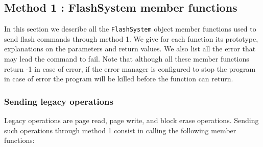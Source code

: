 \subsection{Method 1 : FlashSystem member functions}

In this section we describe all the \verb+FlashSystem+ object member functions used to send flash commands through method 1. We give for each function its prototype, explanations on the parameters and return values. We also list all the error that may lead the command to fail. Note that although all these member functions return -1 in case of error, if the error manager is configured to stop the program in case of error the program will be killed before the function can return.

\subsubsection{Sending legacy operations}

Legacy operations are page read, page write, and block erase operations. Sending such operations through method 1 consist in calling the following member functions:

